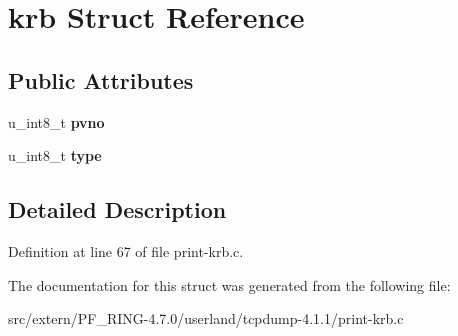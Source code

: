 \hypertarget{structkrb}{
\section{krb Struct Reference}
\label{structkrb}
}
\subsection*{Public Attributes}
\begin{DoxyCompactItemize}
\item 
\hypertarget{structkrb_a956b9b5e00cdb1a9717beb3346a3f74f}{
u\_\-int8\_\-t {\bfseries pvno}}
\label{structkrb_a956b9b5e00cdb1a9717beb3346a3f74f}

\item 
\hypertarget{structkrb_af343b4f34620ec129cfd12a3c53d6ba5}{
u\_\-int8\_\-t {\bfseries type}}
\label{structkrb_af343b4f34620ec129cfd12a3c53d6ba5}

\end{DoxyCompactItemize}


\subsection{Detailed Description}


Definition at line 67 of file print-\/krb.c.



The documentation for this struct was generated from the following file:\begin{DoxyCompactItemize}
\item 
src/extern/PF\_\-RING-\/4.7.0/userland/tcpdump-\/4.1.1/print-\/krb.c\end{DoxyCompactItemize}

